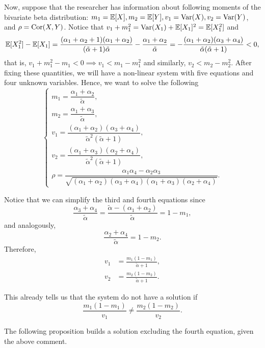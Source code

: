 Now, suppose that the researcher has information about following moments of
the bivariate beta distribution: $m_1 = \mathbb{E}[X], m_2 = \mathbb{E}[Y], v_1 = \operatorname{Var}(X),
v_2 = \operatorname{Var}(Y)$, and $\rho  = \operatorname{Cor}(X,Y)$. Notice that $v_1 + m_1^2 = \operatorname{Var}(X_1)
+ \mathbb{E}[X_1]^2 = \mathbb{E}[X_1^2]$ and
$$
\mathbb{E}[X_1^2] - \mathbb{E}[X_1] = \frac{(\alpha_1 + \alpha_2 + 1)(\alpha_1 + \alpha_2)}{(\tilde{\alpha} + 1)\tilde{\alpha}} - \frac{\alpha_1 + \alpha_2}{\tilde{\alpha}} = -\frac{(\alpha_1 + \alpha_2)(\alpha_3 + \alpha_4)}{\tilde{\alpha}(\tilde{\alpha}+1)} < 0, 
$$
that is, $v_1 + m_1^2 - m_1 < 0 \implies v_1 < m_1 - m_1^2$ and similarly,
$v_2 < m_2 - m_2^2$. After fixing these quantities, we will have a non-linear system with five equations and four
unknown variables. Hence, we want to solve the following 
\begin{equation}
  \label{eq:system-moments-alpha}
  \begin{cases}
    m_1 = \dfrac{\alpha_1+\alpha_2}{\tilde{\alpha}}, \\
    m_2 = \dfrac{\alpha_1+\alpha_3}{\tilde{\alpha}}, \\ 
    v_1 = \dfrac{(\alpha_1+\alpha_2)(\alpha_3+\alpha_4)}{\tilde{\alpha}^2(\tilde{\alpha}+1)}, \\
    v_2 = \dfrac{(\alpha_1+\alpha_3)(\alpha_2+\alpha_4)}{\tilde{\alpha}^2(\tilde{\alpha}+1)}, \\
    \rho = \dfrac{\alpha_1\alpha_4 - \alpha_2\alpha_3}{\sqrt{(\alpha_1+\alpha_2)(\alpha_3+\alpha_4)(\alpha_1+\alpha_3)(\alpha_2+\alpha_4)}}.
  \end{cases}
\end{equation}

Notice that we can simplify the third and fourth equations since 
$$
\frac{\alpha_3 + \alpha_4}{\tilde{\alpha}} = \frac{\tilde{\alpha} - (\alpha_1 + \alpha_2)}{\tilde{\alpha}} = 1 - m_1, 
$$
and analogously, 
$$
\frac{\alpha_2 + \alpha_4}{\tilde{\alpha}} = 1 - m_2. 
$$
Therefore, 
\begin{align*}
    v_1 &= \frac{m_1(1 - m_1)}{\tilde{\alpha} + 1}, \\
    v_2 &= \frac{m_2(1 - m_2)}{\tilde{\alpha} + 1}.
\end{align*}

This already tells us that the system do not have a solution if 
$$
\frac{m_1(1-m_1)}{v_1} \neq \frac{m_2(1-m_2)}{v_2}. 
$$

The following proposition builds a solution excluding the fourth equation, given the above comment. 

